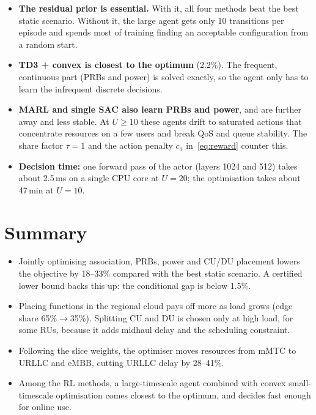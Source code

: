 \documentclass[11pt,oneside]{report}
\begin{document}
\begin{itemize}
	\item \textbf{The residual prior is essential.} With it, all four methods beat the best static scenario. Without it, the large agent gets only 10 transitions per episode and spends most of training finding an acceptable configuration from a random start.
	\item \textbf{TD3 + convex is closest to the optimum} (2.2\%). The frequent, continuous part (PRBs and power) is solved exactly, so the agent only has to learn the infrequent discrete decisions.
	\item \textbf{MARL and single SAC also learn PRBs and power}, and are further away and less stable. At $U\ge10$ these agents drift to saturated actions that concentrate resources on a few users and break QoS and queue stability. The share factor $\tau=1$ and the action penalty $c_a$ in~\eqref{eq:reward} counter this. %
	\item \textbf{Decision time:} one forward pass of the actor (layers 1024 and 512) takes about 2.5\,ms on a single CPU core at $U=20$; the optimisation takes about 47\,min at $U=10$.
\end{itemize}

\section{Summary}\label{sec:summary}
\begin{itemize}
	\item Jointly optimising association, PRBs, power and CU/DU placement lowers the objective by 18--33\% compared with the best static scenario. A certified lower bound backs this up: the conditional gap is below 1.5\%.
	\item Placing functions in the regional cloud pays off more as load grows (edge share 65\%$\to$35\%). Splitting CU and DU is chosen only at high load, for some RUs, because it adds midhaul delay and the scheduling constraint.
	\item Following the slice weights, the optimiser moves resources from mMTC to URLLC and eMBB, cutting URLLC delay by 28--41\%.
	\item Among the RL methods, a large-timescale agent combined with convex small-timescale optimisation comes closest to the optimum, and decides fast enough for online use. %
\end{itemize}
\end{document}
